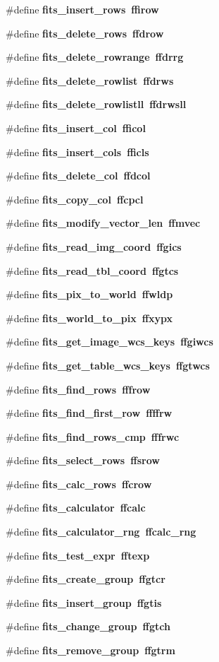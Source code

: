 \begin{CompactItemize}
\item 
\#define \bf{fits\_\-insert\_\-rows}~ffirow
\item 
\#define \bf{fits\_\-delete\_\-rows}~ffdrow
\item 
\#define \bf{fits\_\-delete\_\-rowrange}~ffdrrg
\item 
\#define \bf{fits\_\-delete\_\-rowlist}~ffdrws
\item 
\#define \bf{fits\_\-delete\_\-rowlistll}~ffdrwsll
\item 
\#define \bf{fits\_\-insert\_\-col}~fficol
\item 
\#define \bf{fits\_\-insert\_\-cols}~fficls
\item 
\#define \bf{fits\_\-delete\_\-col}~ffdcol
\item 
\#define \bf{fits\_\-copy\_\-col}~ffcpcl
\item 
\#define \bf{fits\_\-modify\_\-vector\_\-len}~ffmvec
\item 
\#define \bf{fits\_\-read\_\-img\_\-coord}~ffgics
\item 
\#define \bf{fits\_\-read\_\-tbl\_\-coord}~ffgtcs
\item 
\#define \bf{fits\_\-pix\_\-to\_\-world}~ffwldp
\item 
\#define \bf{fits\_\-world\_\-to\_\-pix}~ffxypx
\item 
\#define \bf{fits\_\-get\_\-image\_\-wcs\_\-keys}~ffgiwcs
\item 
\#define \bf{fits\_\-get\_\-table\_\-wcs\_\-keys}~ffgtwcs
\item 
\#define \bf{fits\_\-find\_\-rows}~fffrow
\item 
\#define \bf{fits\_\-find\_\-first\_\-row}~ffffrw
\item 
\#define \bf{fits\_\-find\_\-rows\_\-cmp}~fffrwc
\item 
\#define \bf{fits\_\-select\_\-rows}~ffsrow
\item 
\#define \bf{fits\_\-calc\_\-rows}~ffcrow
\item 
\#define \bf{fits\_\-calculator}~ffcalc
\item 
\#define \bf{fits\_\-calculator\_\-rng}~ffcalc\_\-rng
\item 
\#define \bf{fits\_\-test\_\-expr}~fftexp
\item 
\#define \bf{fits\_\-create\_\-group}~ffgtcr
\item 
\#define \bf{fits\_\-insert\_\-group}~ffgtis
\item 
\#define \bf{fits\_\-change\_\-group}~ffgtch
\item 
\#define \bf{fits\_\-remove\_\-group}~ffgtrm

\end{CompactItemize}
